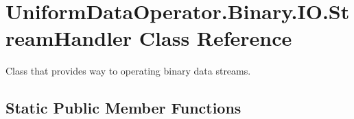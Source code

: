 \hypertarget{class_uniform_data_operator_1_1_binary_1_1_i_o_1_1_stream_handler}{}\section{Uniform\+Data\+Operator.\+Binary.\+I\+O.\+Stream\+Handler Class Reference}
\label{class_uniform_data_operator_1_1_binary_1_1_i_o_1_1_stream_handler}


Class that provides way to operating binary data streams.  


\subsection*{Static Public Member Functions}
